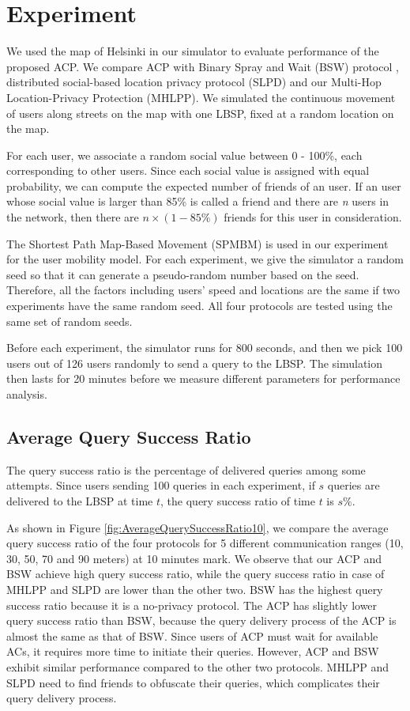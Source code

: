 
\section{ Experiment}

\noindent We used the map of Helsinki in our simulator to evaluate performance of the proposed ACP. We compare ACP with Binary Spray and Wait (BSW) protocol \cite{C31}, distributed social-based location privacy protocol (SLPD) \cite{C16} and our Multi-Hop Location-Privacy Protection (MHLPP). We simulated the continuous movement of users along streets on the map with one LBSP, fixed at a random location on the map.

For each user, we associate a random social value between 0 - 100\%, each corresponding to other users. Since each social value is assigned with equal probability, we can compute the expected number of friends of an user. If an user whose social value is larger than 85\% is called a friend and there are \textit{n} users in the network, then there are $n\times \left(1-85\%\right)$ friends for this user in consideration.

The Shortest Path Map-Based Movement (SPMBM) \cite{C35} is used in our experiment for the user mobility model. For each experiment, we give the simulator a random seed so that it can generate a pseudo-random number based on the seed. Therefore, all the factors including users' speed and locations are the same if two experiments have the same random seed. All four protocols are tested using the same set of random seeds.

Before each experiment, the simulator runs for 800 seconds, and then we pick 100 users out of 126 users randomly to send a query to the LBSP. The simulation then lasts for 20 minutes before we measure different parameters for performance analysis. 


\subsection{ Average Query Success Ratio}

\noindent The query success ratio is the percentage of delivered queries among some attempts. Since users sending 100 queries in each experiment, if $s$ queries are delivered to the LBSP at time $t$, the query success ratio of time $t$ is $s\%$.

As shown in Figure \ref{fig:AverageQuerySuccessRatio10}, we compare the average query success ratio of the four protocols for 5 different communication ranges (10, 30, 50, 70 and 90 meters) at 10 minutes mark. We observe that our ACP and BSW achieve high query success ratio, while the query success ratio in case of MHLPP and SLPD are lower than the other two. BSW has the highest query success ratio because it is a no-privacy protocol. The ACP has slightly lower query success ratio than BSW, because the query delivery process of the ACP is almost the same as that of BSW. Since users of ACP must wait for available ACs, it requires more time to initiate their queries. However, ACP and BSW exhibit similar performance compared to the other two protocols. MHLPP and SLPD need to find friends to obfuscate their queries, which complicates their query delivery process.

